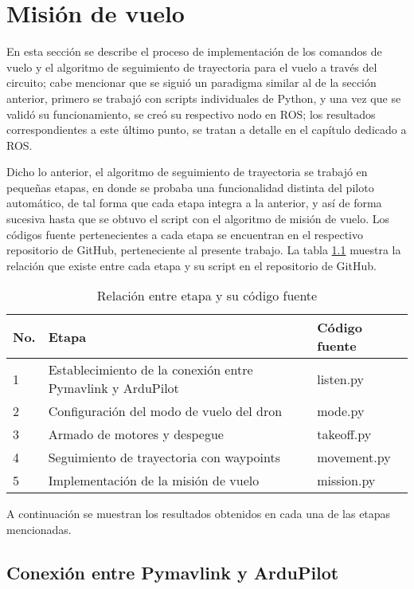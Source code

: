 \chapter{Misión de vuelo}   

En esta sección se describe el proceso de implementación de los comandos de vuelo y el algoritmo de seguimiento de trayectoria para el vuelo a través del circuito; cabe mencionar que se siguió un paradigma similar al de la sección anterior, primero se trabajó con scripts individuales de Python, y una vez que se validó su funcionamiento, se creó su respectivo nodo en ROS; los resultados correspondientes a este último punto, se tratan a detalle en el capítulo dedicado a ROS.

Dicho lo anterior, el algoritmo de seguimiento de trayectoria se trabajó en pequeñas etapas, en donde se probaba una funcionalidad distinta del piloto automático, de tal forma que cada etapa integra a la anterior, y así de forma sucesiva hasta que se obtuvo el script con el algoritmo de misión de vuelo. Los códigos fuente pertenecientes a cada etapa se encuentran en el respectivo repositorio de GitHub, perteneciente al presente trabajo. La tabla \ref{tab:pymavlink} muestra la relación que existe entre cada etapa y su script en el repositorio de GitHub.

\begin{table}[ht]
    \centering
    \begin{tabular}{lll}
        \hline
         No. & Etapa & Código fuente\\
        \hline
        \hline
        1 & Establecimiento de la conexión entre Pymavlink y ArduPilot & listen.py\\
        2 & Configuración del modo de vuelo del dron & mode.py\\
        3 & Armado de motores y despegue & takeoff.py\\
        4 & Seguimiento de trayectoria con waypoints & movement.py\\
        5 & Implementación de la misión de vuelo & mission.py\\
        \hline
        \hline
    \end{tabular}
    \caption{Relación entre etapa y su código fuente}
    \label{tab:pymavlink}
\end{table}

A continuación se muestran los resultados obtenidos en cada una de las etapas mencionadas. 

\section{Conexión entre Pymavlink y ArduPilot}

